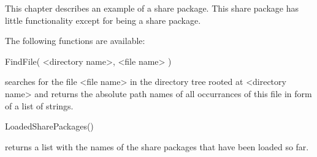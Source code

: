 

This chapter describes an example of a share package.  This share package
has little functionality except for being a share package.


The following functions are available:

\>FindFile( <directory name>, <file name> )

searches  for the  file   <file name> in  the  directory  tree  rooted at
<directory  name> and returns the absolute  path names of all occurrances
of this file in form of a list of strings.

\>LoadedSharePackages()

returns a list with the names of the share packages that have been loaded
so far.



